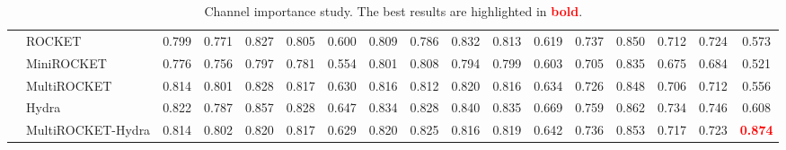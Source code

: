 \begin{table}[tbp]
{\begin{tabular}{llccccc|ccccc|ccccc}
              & ROCKET  
              & 0.799 & 0.771 & 0.827 & 0.805 & 0.600  
              & 0.809 & 0.786 & 0.832 & 0.813 & 0.619  
              & 0.737 & 0.850 & 0.712 & 0.724 & 0.573 \\
              & MiniROCKET & 0.776 & 0.756 & 0.797 & 0.781 & 0.554  
              & 0.801 & 0.808 & 0.794 & 0.799 & 0.603  
              & 0.705 & 0.835 & 0.675 & 0.684 & 0.521 \\
              & MultiROCKET & 0.814 & 0.801 & 0.828 & 0.817 & 0.630  
              & 0.816 & 0.812 & 0.820 & 0.816 & 0.634  
              & 0.726 & 0.848 & 0.706 & 0.712 & 0.556 \\
              & Hydra & 0.822 & 0.787 & 0.857 & 0.828 & 0.647  
              & 0.834 & 0.828 & 0.840 & 0.835 & 0.669  
              & 0.759 & 0.862 & 0.734 & 0.746 & 0.608 \\
              & MultiROCKET-Hydra & 0.814 & 0.802 & 0.820 & 0.817 & 0.629  
              & 0.820 & 0.825 & 0.816 & 0.819 & 0.642  
              & 0.736 & 0.853 & 0.717 & 0.723 & \textcolor{red}{\textbf{0.874}} \\
\bottomrule
\end{tabular}}
\caption{Channel importance study. The best results are highlighted in \textcolor{red}{\textbf{bold}}.}
\label{tab:channel_ablation}
\end{table}